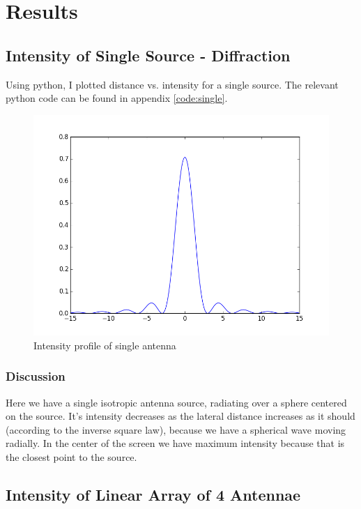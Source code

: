 \chapter{Results}

\section{Intensity of Single Source - Diffraction}

Using python, I plotted distance vs. intensity for a single source. The relevant python code can be found in appendix \ref{code:single}.

\begin{figure}[!h]
\centering	
\includegraphics[scale=0.45]{figure_1.png}
\caption{Intensity profile of single antenna}
\end{figure}

\subsection{Discussion}

Here we have a single isotropic antenna source, radiating over a sphere centered on the source. It's intensity decreases as the lateral distance increases as it should (according to the inverse square law), because we have a spherical wave moving radially. In the center of the screen we have maximum intensity because that is the closest point to the source. 


\section{Intensity of Linear Array of 4 Antennae}

